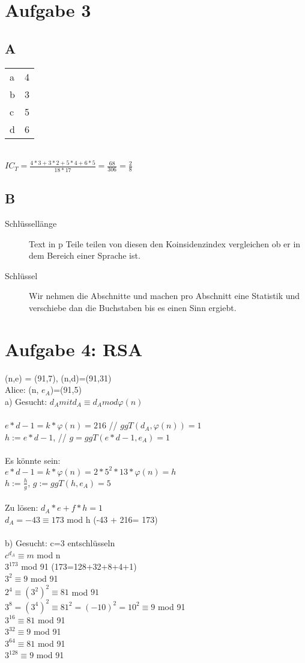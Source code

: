 \documentclass[10pt]{article}
\begin{document}
\section{Aufgabe 3}
\subsection{A}
\begin{tabular}{l | l}
	a & 4 \\
	b & 3 \\
	c & 5 \\
	d & 6
\end{tabular} \\
$IC_T= \frac{4*3+3*2+5*4+6*5}{18*17}=\frac{68}{306}=\frac{2}{8}$
\subsection{B}
\begin{description}
	\item[Schlüssellänge] Text in p Teile teilen von diesen den Koinsidenzindex vergleichen ob er in dem Bereich einer Sprache ist.
	\item[Schlüssel] Wir nehmen die Abschnitte und machen pro Abschnitt eine Statistik und verschiebe dan die Buchstaben bis es einen Sinn ergiebt.
\end{description}

\section{Aufgabe 4: RSA}
(n,e) = (91,7), (n,d)=(91,31) \\
Alice: (n, $e_A$)=(91,5) \\
a) Gesucht: $d_A mit d_A \equiv d_A mod \varphi(n)$ \\ \\
{\color{red} $e*d-1=k*\varphi(n)=216$} // $ggT(d_A,\varphi(n))=1$\\
{\color{red} $h:=e*d-1$}, // $g=ggT(e*d-1,e_A)=1$\\
\\
{\color{blue} 
Es könnte sein: \\
$e*d-1=k*\varphi(n)= 2 * 5^2*13*\varphi(n)=h$ \\
$h:= \frac{h}{g}$, $g:=ggT(h,e_A)=5$ \\
} \\
Zu lösen: $d_A*e+f*h=1$ \\
$d_A=-43 \equiv 173$ mod h (-43 + 216= 173) \\
\\
b) Gesucht: c=3 entschlüsseln \\
$c^{d_A} \equiv m$ mod n \\
$3^173$ mod 91 (173=128+32+8+4+1) \\
$3^2 \equiv 9$ mod 91 \\
$2^4 \equiv (3^2)^2 \equiv 81$ mod $91$ \\
$3^8= (3^4)^2 \equiv 81^2=(-10)^2=10^2 \equiv 9$ mod 91\\
$3^16 \equiv 81$ mod 91 \\
$3^32 \equiv 9$ mod 91 \\
$3^64 \equiv 81$ mod 91 \\
$3^128 \equiv 9$ mod 91
\end{document}
